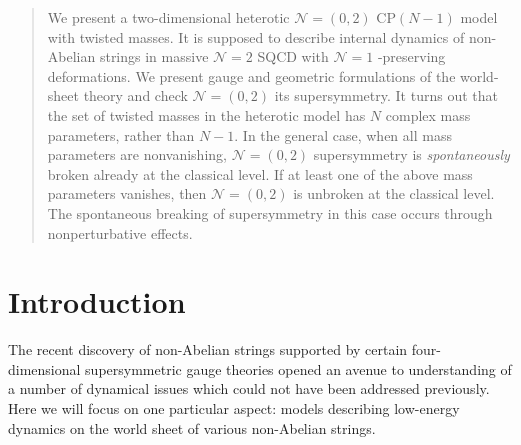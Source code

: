 \documentclass[12pt]{article}
\newcommand{\ntwo}{${\mathcal N}=2$ }
\newcommand{\ntwot}{${\mathcal N}= \left(2,2\right) $ }
\newcommand{\ntwoo}{${\mathcal N}= \left(0,2\right) $ }
\newcommand{\none}{${\mathcal N}=1$ }
\begin{document}
\begin{titlepage}
\begin{abstract}
We present a two-dimensional heterotic \ntwoo CP$(N-1)$ model
with twisted masses. It is supposed to describe internal dynamics of non-Abelian strings 
in massive \ntwo SQCD with
\none-preserving deformations. We present gauge and geometric
formulations of the world-sheet theory and check \ntwoo its
supersymmetry. 
It turns out that the set of twisted masses
 in the heterotic model  has $N$ complex mass parameters, rather than $N-1$.
 In the general case, when all mass parameters are nonvanishing, \ntwoo
 supersymmetry is {\em spontaneously} broken already at the classical level.
 If at least one of the above mass parameters vanishes, then \ntwoo is unbroken at the classical level.
 The spontaneous breaking of supersymmetry in this case occurs through nonperturbative effects.



 

\end{abstract}

\end{titlepage}

\section{Introduction}

The recent discovery of non-Abelian strings 
\cite{HT1,ABEKY,SYmon,HT2}
supported by certain four-dimensional supersymmetric gauge theories 
opened an avenue to understanding of a number of dynamical issues which could not have been addressed
previously. Here we will focus on one particular aspect: models describing low-energy dynamics
on the world sheet of various non-Abelian strings.
\end{document}
